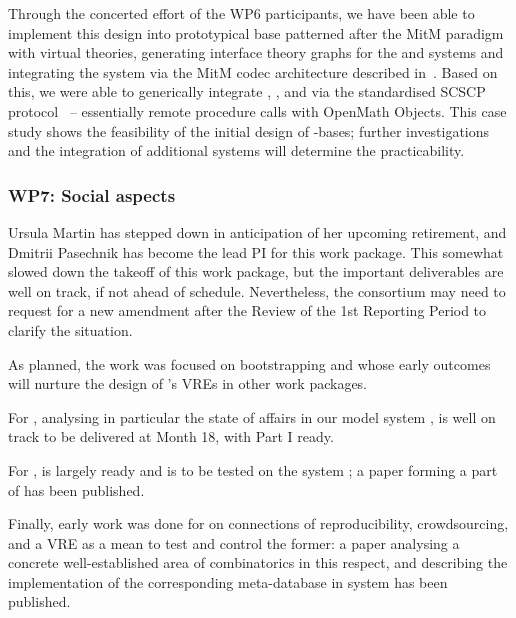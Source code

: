 \documentclass{deliverablereport}
\begin{document}
Through the concerted effort of the WP6 participants, we have been
able to implement this design into prototypical \DKS base patterned
after the MitM paradigm with virtual theories, generating interface
theory graphs for the \GAP and \Sage systems and integrating the
\LMFDB system via the MitM codec architecture described
in~\cite{ODK-D6.2}. Based on this, we were able to generically
integrate \GAP, \Sage, and \LMFDB via the standardised SCSCP
protocol~\cite{HorRoz:ossp09} -- essentially remote procedure calls
with OpenMath Objects. This case study shows the feasibility of the
initial design of \DKS-bases; further investigations and the
integration of additional systems will determine the practicability.

\subsubsection{WP7: Social aspects}

Ursula Martin has stepped down in anticipation of her upcoming
retirement, and Dmitrii Pasechnik has become the lead PI for this work
package.  This somewhat slowed down the takeoff of this work package,
but the important deliverables are well on track, if not ahead of
schedule. Nevertheless, the consortium may need to request for a new
amendment after the Review of the 1st Reporting Period to clarify the
situation.

As planned, the work was focused on bootstrapping
 and
 whose early
outcomes will nurture the design of \ODK's VREs in other work
packages.

For ,
 analysing in
particular the state of affairs in our model system \Sage, is well on
track to be delivered at Month 18, with Part I ready.

For ,
 is largely ready and is to
be tested on the system \Sage; a paper
\cite{Pavlou:2016:MCI:2936924.2936934} forming a part of
 has been published.

Finally, early work was done for
 on connections of
reproducibility, crowdsourcing, and a VRE as a mean to test and
control the former: a paper \cite{2016arXiv160100181C} analysing a
concrete well-established area of combinatorics in this respect, and
describing the implementation of the corresponding meta-database in
\Sage system has been published.
\end{document}
